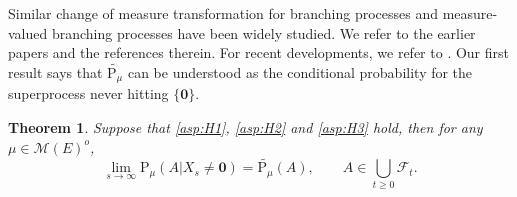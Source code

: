 \documentclass[12pt,a4paper]{amsart}
\numberwithin{equation}{section}
\theoremstyle{plain}
\newtheorem{thm}{Theorem}[section]
\theoremstyle{definition}
\theoremstyle{remark}
\newtheorem{remark}{Remark}
\begin{document}

\begin{comment}
\begin{remark}
	Denote by $E_\partial^*$ as a topological space with exactly the same elements as $E_\partial$, but with a different topology assuming that $\partial$ is an isolated point not contained in $E$.
	If one change the setting by assuming that $\xi$ is an $E_\partial^*$-valued Hunt process (instead of being an $E_\partial$-valued Hunt process), then the corresponding $(\xi,\psi)$-superprocess $X$ has an $\mathcal M(E)$-valued Hunt version (See \cite[Theorem 5.12]{Li2011Measure-valued}).
	In this case, since $X$ has c\`adl\`ag sample paths, the existence of a measure $\widetilde {\mathrm P_\mu}$ on space of $\mathcal M(E)$-valued c\`adl\`ag sample paths so that \eqref{eq:M.3} holds follows directly from the standard martingale change of measure theory (See \cite[Lemma 18.18]{Kallenberg2002Foundations}).
	However, this setting will exclude some interesting cases. For example, if $E$ is a standard ball in the Euclidean space, and $\xi$ is a Brownian motion killed (i.e. forced to take value $\partial$) upon leaving the ball, then $\xi$ is a $E_\partial$-valued Hunt process, but not a $E_\partial^*$-Hunt process.
\end{remark}
\end{comment}

	Similar change of measure
	transformation for branching processes and measure-valued branching processes have been widely studied.
	We refer to the earlier papers \cite{EnglanderKyprianou2004Local,Evans1993Two,Penisson2010Conditional,RoellyRouault1989Processus} and the references therein.
	For recent developments, we refer to \cite{ChampagnatRoelly2008Limit,RenSongSun2020Spine,RenSongZhang2018Williams}.
	Our first result says that $\widetilde {\mathrm P_\mu}$ can be understood as the conditional probability for the superprocess never hitting $\{\mathbf 0\}$. 

	\begin{thm} \label{thm:Q}
	Suppose that \eqref{asp:H1}, \eqref{asp:H2} and \eqref{asp:H3} hold, then
	for any $\mu \in \mathcal M(E)^o$,
\[
	\lim_{s \rightarrow \infty} \mathrm P_\mu(A |X_s\neq \mathbf 0)=
	\widetilde{\mathrm P_\mu}(A),
	\qquad 
	A\in \bigcup_{t\geq 0}\mathscr F_t.
\]
\end{thm}
\end{document}

